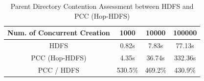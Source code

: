 \begin{table}[h]
	\centering
	\begin{tabular}{|c|c|c|c|}
		\hline
		\textbf{Num. of Concurrent Creation} & \textbf{1000} & \textbf{10000} & \textbf{100000} \\ \hline
		HDFS                                 & 0.82s         & 7.83s          & 77.13s          \\ \hline
		PCC (Hop-HDFS)                       & 4.35s         & 36.74s         & 332.36s         \\ \hline
		PCC / HDFS                           & 530.5\%       & 469.2\%        & 430.9\%         \\ \hline
	\end{tabular}
		\caption{Parent Directory Contention Assessment between HDFS and PCC (Hop-HDFS)}
		\label{table:hdfsPCCparent}
\end{table}